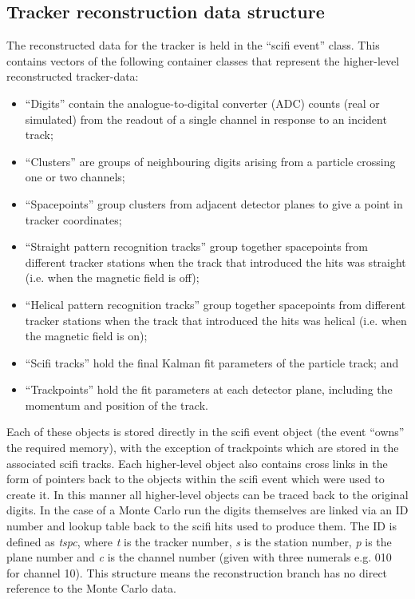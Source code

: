 \subsection{Tracker reconstruction data structure}
\label{subsec:TrackerReconDataStructure}
The reconstructed data for the tracker is held in the ``scifi event'' class.  This contains vectors of the following container classes that represent the higher-level reconstructed tracker-data:

\begin{itemize}
  \item ``Digits'' contain the analogue-to-digital converter (ADC) counts (real or simulated) from the readout of a single channel in response to an incident track;
  \item ``Clusters'' are groups of neighbouring digits arising from a particle crossing one or two channels;
  \item ``Spacepoints'' group clusters from adjacent detector planes to give a point in tracker coordinates;
  \item ``Straight pattern recognition tracks'' group together spacepoints from different tracker stations when the track that introduced the hits was straight (i.e. when the magnetic field is off); %
  \item ``Helical pattern recognition tracks'' group together spacepoints from different tracker stations when the track that introduced the hits was helical (i.e. when the magnetic field is on); %
  \item ``Scifi tracks'' hold the final Kalman fit parameters of the particle track; and
  \item ``Trackpoints'' hold the fit parameters at each detector plane, including the momentum and position of the track.
\end{itemize}

Each of these objects is stored directly in the scifi event object (the event ``owns'' the required memory), with the exception of trackpoints which are stored in the associated scifi tracks.  Each higher-level object also contains cross links in the form of pointers back to the objects within the scifi event which were used to create it. In this manner all higher-level objects can be traced back to the original digits.  In the case of a Monte Carlo run the digits themselves are linked via an ID number and lookup table back to the scifi hits used to produce them. The ID is defined as \textit{tspc}, where \textit{t} is the tracker number, \textit{s} is the station number, \textit{p} is the plane number and \textit{c} is the channel number (given with three numerals e.g. 010 for channel 10).  This structure means the reconstruction branch has no direct reference to the Monte Carlo data.